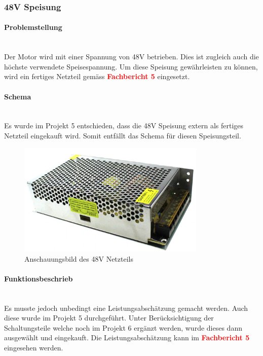 \subsubsection{48V Speisung}
\label{subsubec:48V Speisung}

\paragraph{Problemstellung}\mbox{}\\

Der Motor wird mit einer Spannung von 48V betrieben. Dies ist zugleich auch die höchste verwendete Speisespannung. Um diese Speisung gewährleisten zu können, wird ein fertiges Netzteil gemäss  \textcolor{red}{\textbf{Fachbericht 5}} eingesetzt.

\paragraph{Schema}\mbox{}\\

Es wurde im Projekt 5 entschieden, dass die 48V Speisung extern als fertiges Netzteil eingekauft wird. Somit entfällt das Schema für diesen Speisungsteil.  

\begin{figure}[h!]
	\centering
	\includegraphics[width=0.8\textwidth]{graphics/Netzteil_48V.png}
	\caption{Anschauungsbild des 48V Netzteils}
	\label{fig:Netzteil_48V}
\end{figure} 


\paragraph{Funktionsbeschrieb}\mbox{}\\

Es musste jedoch unbedingt eine Leistungsabschätzung gemacht werden. Auch diese wurde im Projekt 5 durchgeführt. Unter Berücksichtigung der Schaltungsteile welche noch im Projekt 6 ergänzt werden, wurde dieses dann ausgewählt und eingekauft. Die Leistungsabschätzung kann im \textcolor{red}{\textbf{Fachbericht 5}} eingesehen werden. 